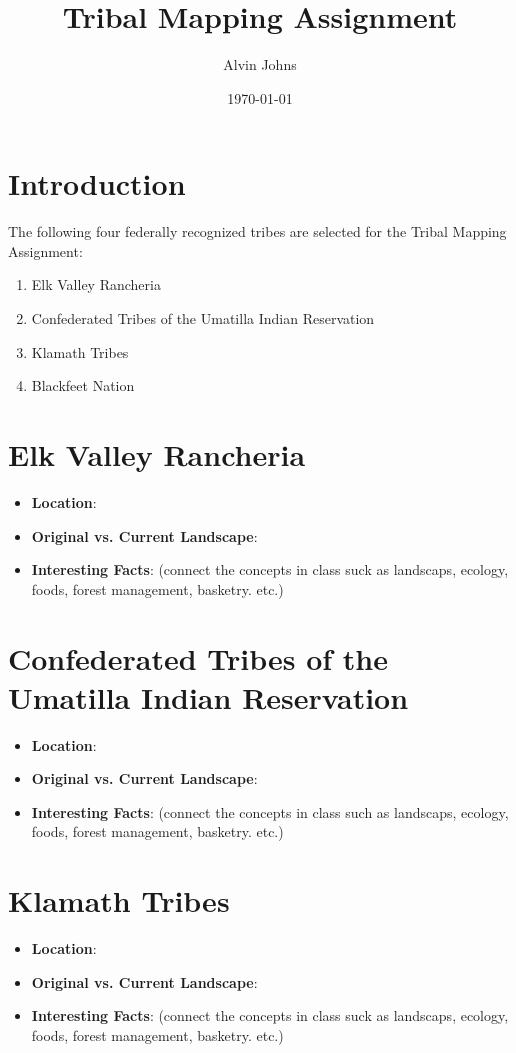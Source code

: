 \documentclass{article}
\title{Tribal Mapping Assignment}
\author{Alvin Johns}
\date{\today}
\begin{document}
\maketitle

\section{Introduction}
The following four federally recognized tribes are selected for the Tribal Mapping Assignment:
\begin{enumerate}
    \item Elk Valley Rancheria
    \item Confederated Tribes of the Umatilla Indian Reservation 
    \item Klamath Tribes
    \item Blackfeet Nation
\end{enumerate}

\section*{Elk Valley Rancheria}
\begin{itemize}
    \item \textbf{Location}: 
    \item \textbf{Original vs. Current Landscape}: 
    \item \textbf{Interesting Facts}: (connect the concepts in class suck as landscaps, ecology, foods, forest management, basketry. etc.)
\end{itemize}

\section*{Confederated Tribes of the Umatilla Indian Reservation}
\begin{itemize}
    \item \textbf{Location}: 
    \item \textbf{Original vs. Current Landscape}: 
    \item \textbf{Interesting Facts}: (connect the concepts in class such as landscaps, ecology, foods, forest management, basketry. etc.)
\end{itemize}

\section*{Klamath Tribes}
\begin{itemize}
    \item \textbf{Location}: 
    \item \textbf{Original vs. Current Landscape}: 
    \item \textbf{Interesting Facts}: (connect the concepts in class suck as landscaps, ecology, foods, forest management, basketry. etc.)
\end{itemize}
\end{document}
